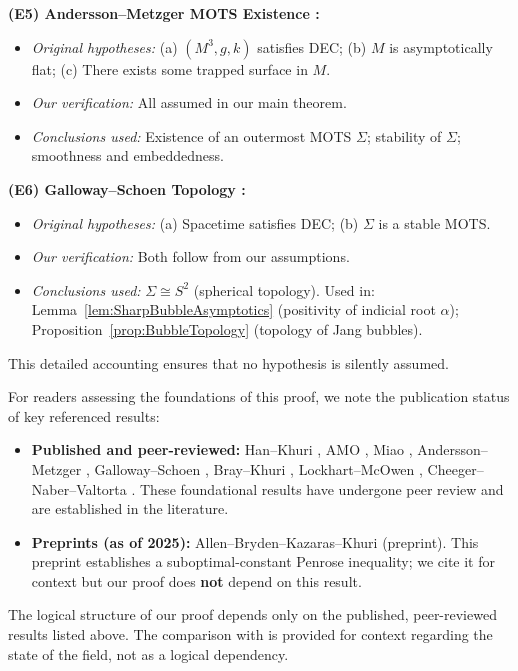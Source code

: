 \textbf{(E5) Andersson--Metzger MOTS Existence \cite{anderssonmetzger2009}:}
\begin{itemize}
    \item \textit{Original hypotheses:} (a) $(M^3, g, k)$ satisfies DEC; (b) $M$ is asymptotically flat; (c) There exists some trapped surface in $M$.
    \item \textit{Our verification:} All assumed in our main theorem.
    \item \textit{Conclusions used:} Existence of an outermost MOTS $\Sigma$; stability of $\Sigma$; smoothness and embeddedness.
\end{itemize}

\textbf{(E6) Galloway--Schoen Topology \cite{gallowayschoen2006}:}
\begin{itemize}
    \item \textit{Original hypotheses:} (a) Spacetime satisfies DEC; (b) $\Sigma$ is a stable MOTS.
    \item \textit{Our verification:} Both follow from our assumptions.
    \item \textit{Conclusions used:} $\Sigma \cong S^2$ (spherical topology). Used in: Lemma~\ref{lem:SharpBubbleAsymptotics} (positivity of indicial root $\alpha$); Proposition~\ref{prop:BubbleTopology} (topology of Jang bubbles).
\end{itemize}

This detailed accounting ensures that no hypothesis is silently assumed.

\begin{remark}\label{rem:PreprinterStatus}
For readers assessing the foundations of this proof, we note the publication status of key referenced results:
\begin{itemize}
    \item \textbf{Published and peer-reviewed:} Han--Khuri \cite{hankhuri2013}, AMO \cite{amo2024}, Miao \cite{miao2002}, Andersson--Metzger \cite{anderssonmetzger2009}, Galloway--Schoen \cite{gallowayschoen2006}, Bray--Khuri \cite{braykhuri2010}, Lockhart--McOwen \cite{lockhartmccowen1985}, Cheeger--Naber--Valtorta \cite{cheegernabervaltorta2015}. These foundational results have undergone peer review and are established in the literature.
    \item \textbf{Preprints (as of 2025):} Allen--Bryden--Kazaras--Khuri \cite{allenbrydenkazaraskhuri2025} (preprint). This preprint establishes a suboptimal-constant Penrose inequality; we cite it for context but our proof does \textbf{not} depend on this result.
\end{itemize}
The logical structure of our proof depends only on the published, peer-reviewed results listed above. The comparison with \cite{allenbrydenkazaraskhuri2025} is provided for context regarding the state of the field, not as a logical dependency.
\end{remark}


